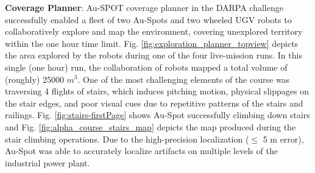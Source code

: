 \documentclass[letterpaper, 10pt, conference]{ieeeconf}      %
\newcommand{\ph}[1]{{\textbf{#1}:}} %
\newcommand{\rev}[1]{{\color{blue}#1}} %
\begin{document}
\ph{Coverage Planner}
Au-SPOT coverage planner in the DARPA challenge successfully enabled a fleet of two Au-Spots and two wheeled UGV robots to collaboratively explore and map the environment, covering unexplored territory within the one hour time limit. Fig. \ref{fig:exploration_planner_topview} depicts the area explored by the robots during one of the four live-mission runs. In this single (one hour) run, the collaboration of robots mapped a total volume of \rev{(roughly)} 25000 ${m}^{3}$. %
One of the most challenging elements of the course was traversing 4 flights of stairs, which induces pitching motion, physical slippages on the stair edges, and poor visual cues due to repetitive patterns of the stairs and railings. Fig. \ref{fig:stairs-firstPage} shows Au-Spot successfully climbing down stairs and Fig. \ref{fig:alpha_course_stairs_map} depicts the map produced during the stair climbing operations.  Due to the high-precision localization ($\leq$ 5 m error), Au-Spot was able to accurately localize artifacts on multiple levels of the industrial power plant.






\end{document}
